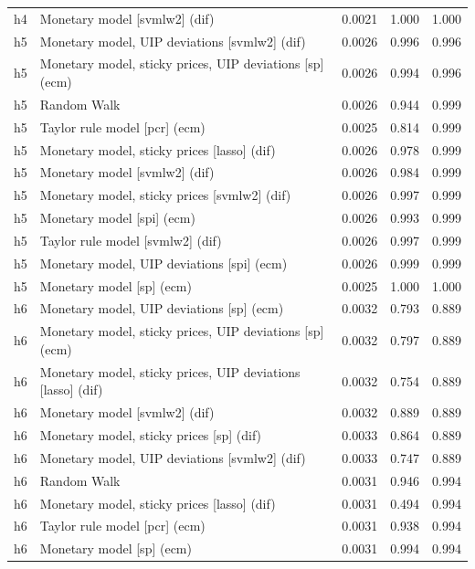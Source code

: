 \begin{ThreePartTable}
\begin{longtable}[t]{cp{5.5cm}ccc}
h4 & \raggedright Monetary model [svmlw2] (dif) & 0.0021 & 1.000 & 1.000\\
\addlinespace
h5 & \raggedright Monetary model, UIP deviations [svmlw2] (dif) & 0.0026 & 0.996 & 0.996\\
h5 & \raggedright Monetary model, sticky prices, UIP deviations [sp] (ecm) & 0.0026 & 0.994 & 0.996\\
h5 & \raggedright Random Walk & 0.0026 & 0.944 & 0.999\\
h5 & \raggedright Taylor rule model [pcr] (ecm) & 0.0025 & 0.814 & 0.999\\
h5 & \raggedright Monetary model, sticky prices [lasso] (dif) & 0.0026 & 0.978 & 0.999\\
h5 & \raggedright Monetary model [svmlw2] (dif) & 0.0026 & 0.984 & 0.999\\
h5 & \raggedright Monetary model, sticky prices [svmlw2] (dif) & 0.0026 & 0.997 & 0.999\\
h5 & \raggedright Monetary model [spi] (ecm) & 0.0026 & 0.993 & 0.999\\
h5 & \raggedright Taylor rule model [svmlw2] (dif) & 0.0026 & 0.997 & 0.999\\
h5 & \raggedright Monetary model, UIP deviations [spi] (ecm) & 0.0026 & 0.999 & 0.999\\
h5 & \raggedright Monetary model [sp] (ecm) & 0.0025 & 1.000 & 1.000\\
\addlinespace
h6 & \raggedright Monetary model, UIP deviations [sp] (ecm) & 0.0032 & 0.793 & 0.889\\
h6 & \raggedright Monetary model, sticky prices, UIP deviations [sp] (ecm) & 0.0032 & 0.797 & 0.889\\
h6 & \raggedright Monetary model, sticky prices, UIP deviations [lasso] (dif) & 0.0032 & 0.754 & 0.889\\
h6 & \raggedright Monetary model [svmlw2] (dif) & 0.0032 & 0.889 & 0.889\\
h6 & \raggedright Monetary model, sticky prices [sp] (dif) & 0.0033 & 0.864 & 0.889\\
h6 & \raggedright Monetary model, UIP deviations [svmlw2] (dif) & 0.0033 & 0.747 & 0.889\\
h6 & \raggedright Random Walk & 0.0031 & 0.946 & 0.994\\
h6 & \raggedright Monetary model, sticky prices [lasso] (dif) & 0.0031 & 0.494 & 0.994\\
h6 & \raggedright Taylor rule model [pcr] (ecm) & 0.0031 & 0.938 & 0.994\\
h6 & \raggedright Monetary model [sp] (ecm) & 0.0031 & 0.994 & 0.994\\

\end{longtable}
\end{ThreePartTable}
